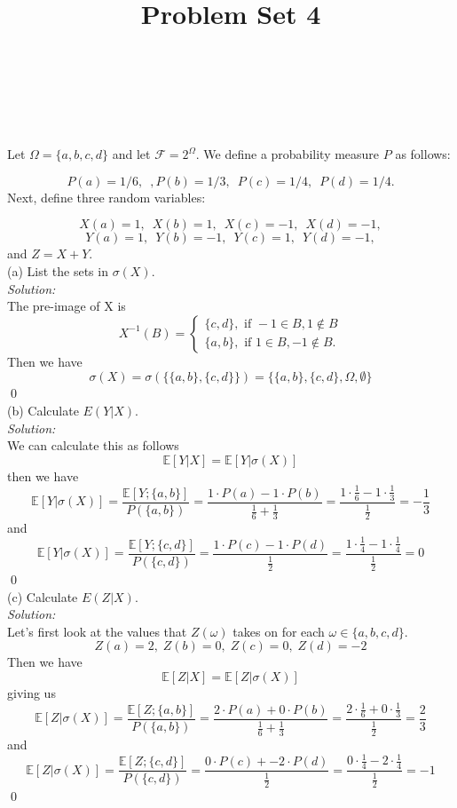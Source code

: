 \documentclass[10pt]{amsart}
\begin{document}
\noindent
{} \\
 \\
 \\
\title{Problem Set 4}
\maketitle

 Let $\Omega=\{a,b,c,d\}$ and let $\mathcal{F}=2^{\Omega}$. We define a probability measure $P$ as follows:

$$P({a})=1/6, \,\,\,, P({b})=1/3, \,\,\, P({c})=1/4, \,\,\, P({d})=1/4.$$
Next, define three random variables:

$$X(a)=1, \,\,\, X(b)=1, \,\,\, X(c)=-1, \,\,\,  X(d)=-1,$$
$$Y(a)=1, \,\,\, Y(b)=-1, \,\,\, Y(c)=1, \,\,\,  Y(d)=-1,$$
and $Z=X+Y$. \\

\noindent
(a) List the sets in $\sigma(X)$. \\
\textit{Solution:} \\
The pre-image of X is
$$
X^{-1}(B) =
\begin{cases}
	\{c, d\}, \text{ if } -1 \in B, 1 \not\in B \\
	\{a, b\}, \text{ if } 1 \in B, -1 \not\in B.
\end{cases}
$$
Then we have
$$\sigma(X) = \sigma(\big\{ \{a, b\}, \{c, d\} \big\}) = \bigg\{ \{a, b\}, \{c, d\}, \Omega, \emptyset \bigg\}$$
\qed
\\

\noindent
(b) Calculate $E(Y|X)$. \\
\textit{Solution:} \\
We can calculate this as follows
$$
\mathbb E[Y | X] = \mathbb E [Y | \sigma(X)]
$$
then we have
$$
\mathbb E [Y | \sigma(X)] = \frac {\mathbb E[ Y; \{ a, b \}]}{P(\{ a, b\})} = \frac {1\cdot P(a)  -1\cdot P(b)}{\frac 1 6 + \frac 1 3} = \frac {1\cdot \frac 1 6 - 1\cdot \frac 1 3}{\frac 1 2} = - \frac 1 3
$$
and
$$
\mathbb E [Y | \sigma(X)] = \frac {\mathbb E[ Y; \{ c, d \}]}{P(\{ c, d\})} = \frac {1\cdot P(c) - 1\cdot P(d)}{\frac 1 2} = \frac { 1\cdot \frac 1 4 - 1\cdot \frac 1 4}{\frac 1 2}  = 0
$$
\qed \\

\noindent
(c) Calculate $E(Z|X)$. \\
\textit{Solution:} \\
Let's first look at the values that $Z(\omega)$ takes on for each $\omega \in \{a, b, c, d\}$.
$$
Z(a) = 2,\;Z(b) = 0,\;Z(c) = 0,\;Z(d) = -2
$$
Then we have
$$
\mathbb E[Z|X] = \mathbb E[Z | \sigma(X)]
$$
giving us
$$
\mathbb E [Z | \sigma(X)] = \frac {\mathbb E[ Z; \{ a, b \}]}{P(\{ a, b\})} = \frac {2\cdot P(a) + 0\cdot P(b)}{\frac 1 6 + \frac 1 3} = \frac {2\cdot \frac 1 6 + 0\cdot \frac 1 3}{\frac 1 2} = \frac 2 3
$$
and
$$
\mathbb E [Z | \sigma(X)] = \frac {\mathbb E[ Z; \{ c, d \}]}{P(\{ c, d\})} = \frac {0\cdot P(c) + -2\cdot P(d)}{\frac 1 2} = \frac {0\cdot \frac 1 4 -2\cdot \frac 1 4}{\frac 1 2}  = -1
$$
\qed \\
\newpage
\end{document}
